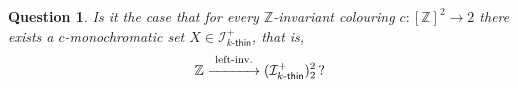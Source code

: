 \documentclass{amsart}
\newtheorem{question}[theorem]{Question}
\theoremstyle{definition}
\theoremstyle{remark}
\numberwithin{equation}{section}
\begin{document}
\begin{question}
    Is it the case that for every $\mathbb Z$-invariant colouring $c:[\mathbb Z]^2\longrightarrow 2$ there exists a $c$-monochromatic set $X\in \mathcal{I}_{\text{$k$-$\mathsf{thin}$}}^+$, that is,
    \[
    \mathbb{Z} \overset{\text{left-inv.}}{\xrightarrow{\hspace{1.1cm}}} (\mathcal{I}_{\text{$k$-$\mathsf{thin}$}}^+)^{2}_{2} \,?
    \]
\end{question}






\end{document}
